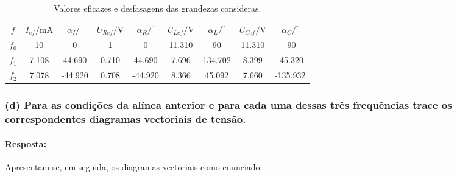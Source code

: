 \begin{table}[ht]
    \centering
    \caption{Valores eficazes e desfasagens das grandezas consideras.}
    \label{tab1}
    \begin{tabular}{SSSSSSSSS}
        \toprule
        $f$ & $I_{ef}/\text{mA}$ & $\alpha_I/^{\circ}$ & $U_{Ref}/\text{V}$ & $\alpha_R/^{\circ}$ & $U_{Lef}/\text{V}$ & $\alpha_L/^{\circ}$ & $U_{Cef}/\text{V}$ & $\alpha_C/^{\circ}$ \\ \midrule
        $f_0$  & 10 & 0 & 1 & 0 & 11.310 & 90 & 11.310 & -90\\
        $f_1$  & 7.108 & 44.690 & 0.710 & 44.690 & 7.696 & 134.702 & 8.399 & -45.320\\
        $f_2$ & 7.078 & -44.920 & 0.708 & -44.920 & 8.366 & 45.092 & 7.660 & -135.932\\ \bottomrule
    \end{tabular}
\end{table}
\subsubsection*{(d) Para as condições da alínea anterior e para cada uma dessas três frequências trace os correspondentes diagramas vectoriais de tensão.}
\paragraph{Resposta:}
Apresentam-se, em seguida, os diagramas vectoriais como enunciado:


